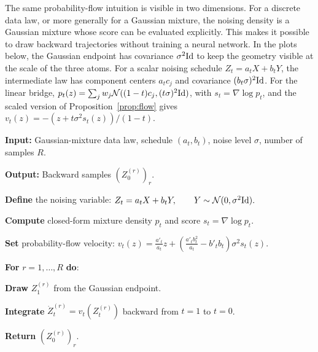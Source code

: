 The same probability-flow intuition is visible in two dimensions. For a discrete data law, or more generally for a Gaussian mixture, the noising density is a Gaussian mixture whose score can be evaluated explicitly. This makes it possible to draw backward trajectories without training a neural network. In the plots below, the Gaussian endpoint has covariance $\sigma^2\mathrm{Id}$ to keep the geometry visible at the scale of the three atoms. For a scalar noising schedule $Z_t=a_tX+b_tY$, the intermediate law has component centers $a_t c_j$ and covariance $(b_t\sigma)^2\mathrm{Id}$. For the linear bridge, $p_t(z)=\sum_j w_j\mathcal{N}((1-t)c_j,(t\sigma)^2\mathrm{Id})$, with $s_t=\nabla\log p_t$, and the scaled version of Proposition~\ref{prop:flow} gives $v_t(z)=-(z+t\sigma^2s_t(z))/(1-t)$.

\begin{alg}\label{alg:gaussian-mixture-probability-flow-sampling}
\textbf{Input:} Gaussian-mixture data law, schedule $(a_t,b_t)$, noise level $\sigma$, number of samples $R$.

\textbf{Output:} Backward samples $(Z_0^{(r)})_r$.

\textbf{Define} the noising variable:
\(Z_t=a_tX+b_tY, \qquad Y\sim\mathcal{N}(0,\sigma^2\mathrm{Id}).\)

\textbf{Compute} closed-form mixture density $p_t$ and score $s_t=\nabla\log p_t$.

\textbf{Set} probability-flow velocity:
\(v_t(z)=\frac{a'_t}{a_t}z+ \left(\frac{a'_tb_t^2}{a_t}-b'_tb_t\right)\sigma^2s_t(z).\)

\textbf{For} $r=1,\ldots,R$ \textbf{do}:
\begin{algblock}

\textbf{Draw} $Z_1^{(r)}$ from the Gaussian endpoint.

\textbf{Integrate} $\dot Z_t^{(r)}=v_t(Z_t^{(r)})$ backward from $t=1$ to $t=0$.

\end{algblock}
\algreturnskip
\textbf{Return} $(Z_0^{(r)})_r$.
\end{alg}

